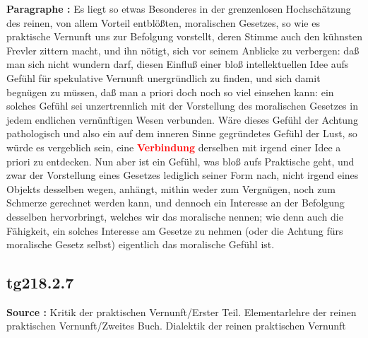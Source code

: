 \documentclass[a4paper,12pt,twoside]{book}
\newcommand{\match}[1]{\textcolor{red}{\textbf{#1}}}
\begin{document}
	\noindent\textbf{Paragraphe : }Es liegt so etwas Besonderes in der grenzenlosen Hochschätzung des reinen, von allem Vorteil entblößten, moralischen Gesetzes, so wie es praktische Vernunft uns zur Befolgung vorstellt, deren Stimme auch den kühnsten Frevler zittern macht, und ihn nötigt, sich vor seinem Anblicke zu verbergen: daß man sich nicht wundern darf, diesen Einfluß einer bloß intellektuellen Idee aufs Gefühl für spekulative Vernunft unergründlich zu finden, und sich damit begnügen zu müssen, daß man a priori doch noch so viel einsehen kann: ein solches Gefühl sei unzertrennlich mit der Vorstellung des moralischen Gesetzes in jedem endlichen vernünftigen Wesen verbunden. Wäre dieses Gefühl der Achtung pathologisch und also ein auf dem inneren Sinne gegründetes Gefühl der Lust, so würde es vergeblich sein, eine \match{Verbindung} derselben mit irgend einer Idee a priori zu entdecken. Nun aber ist ein Gefühl, was bloß aufs Praktische geht, und zwar der Vorstellung eines Gesetzes lediglich seiner Form nach, nicht irgend eines Objekts desselben wegen, anhängt, mithin weder zum Vergnügen, noch zum Schmerze gerechnet werden kann, und dennoch ein Interesse an der Befolgung desselben hervorbringt, welches wir das moralische nennen; wie denn auch die Fähigkeit, ein solches  Interesse am Gesetze zu nehmen (oder die Achtung fürs moralische Gesetz selbst) eigentlich das moralische Gefühl ist. 
	
	\subsection*{tg218.2.7} 
	\textbf{Source : }Kritik der praktischen Vernunft/Erster Teil. Elementarlehre der reinen praktischen Vernunft/Zweites Buch. Dialektik der reinen praktischen Vernunft\\  
	
\end{document}

